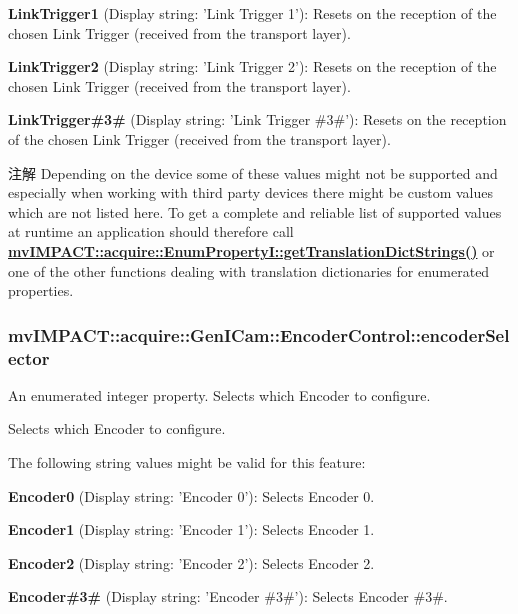 \begin{DoxyItemize}
\item {\bfseries Link\+Trigger1} (Display string\+: 'Link Trigger 1')\+: Resets on the reception of the chosen Link Trigger (received from the transport layer).
\item {\bfseries Link\+Trigger2} (Display string\+: 'Link Trigger 2')\+: Resets on the reception of the chosen Link Trigger (received from the transport layer).
\item {\bfseries Link\+Trigger\#3\#} (Display string\+: 'Link Trigger \#3\#')\+: Resets on the reception of the chosen Link Trigger (received from the transport layer).
\end{DoxyItemize}

\begin{DoxyNote}{注解}
Depending on the device some of these values might not be supported and especially when working with third party devices there might be custom values which are not listed here. To get a complete and reliable list of supported values at runtime an application should therefore call {\bfseries \hyperlink{classmv_i_m_p_a_c_t_1_1acquire_1_1_enum_property_i_a0ba6ccbf5ee69784d5d0b537924d26b6}{mv\+I\+M\+P\+A\+C\+T\+::acquire\+::\+Enum\+Property\+I\+::get\+Translation\+Dict\+Strings()}} or one of the other functions dealing with translation dictionaries for enumerated properties. 
\end{DoxyNote}
\hypertarget{classmv_i_m_p_a_c_t_1_1acquire_1_1_gen_i_cam_1_1_encoder_control_a1a1395b78f2907c71bce8f511e38a123}{
\subsubsection[{encoder\+Selector}]{ mv\+I\+M\+P\+A\+C\+T\+::acquire\+::\+Gen\+I\+Cam\+::\+Encoder\+Control\+::encoder\+Selector}}\label{classmv_i_m_p_a_c_t_1_1acquire_1_1_gen_i_cam_1_1_encoder_control_a1a1395b78f2907c71bce8f511e38a123}


An enumerated integer property. Selects which Encoder to configure. 

Selects which Encoder to configure.

The following string values might be valid for this feature\+:
\begin{DoxyItemize}
\item {\bfseries Encoder0} (Display string\+: 'Encoder 0')\+: Selects Encoder 0.
\item {\bfseries Encoder1} (Display string\+: 'Encoder 1')\+: Selects Encoder 1.
\item {\bfseries Encoder2} (Display string\+: 'Encoder 2')\+: Selects Encoder 2.
\item {\bfseries Encoder\#3\#} (Display string\+: 'Encoder \#3\#')\+: Selects Encoder \#3\#.
\end{DoxyItemize}

